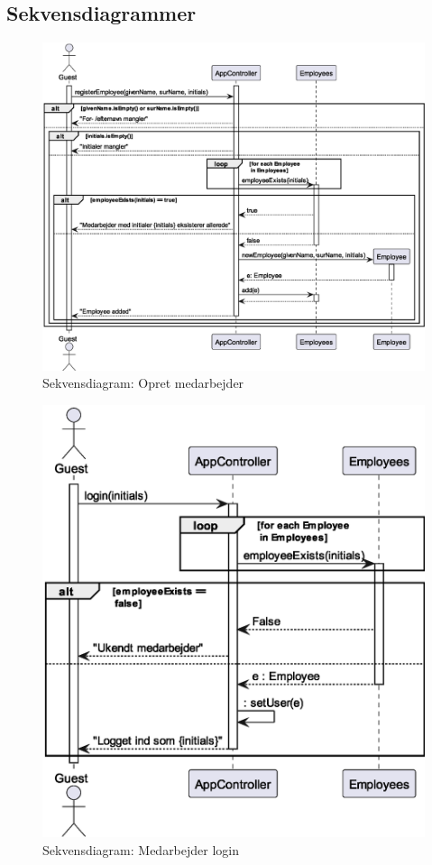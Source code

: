 \subsection{Sekvensdiagrammer}\label{sec:sequence}
\begin{figure}[H]
    \centering
    \caption{Sekvensdiagram: Opret medarbejder}\label{fig:sequenceRegisterEmployee}
    \includegraphics[width = .75\textwidth]{Diagrams/seq_registerEmployee.eps}
\end{figure}
\begin{figure}[H]
    \centering
    \caption{Sekvensdiagram: Medarbejder login}\label{fig:sequence_login}
    \includegraphics[width = .5\textwidth]{Diagrams/Login.eps}
\end{figure}
